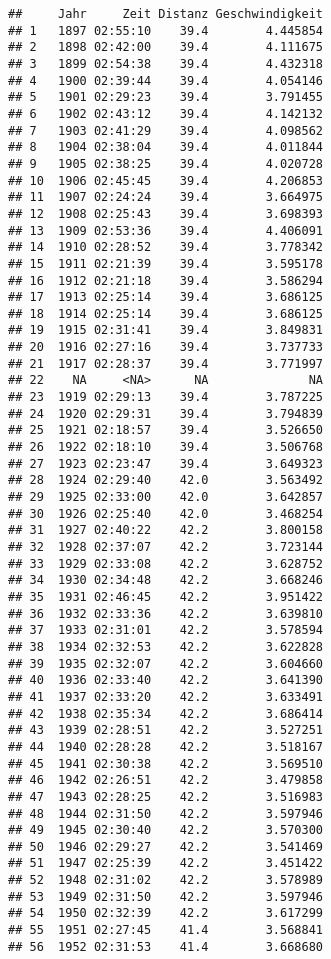 \documentclass[
]{article}
\begin{document}
\begin{verbatim}
##     Jahr     Zeit Distanz Geschwindigkeit
## 1   1897 02:55:10    39.4        4.445854
## 2   1898 02:42:00    39.4        4.111675
## 3   1899 02:54:38    39.4        4.432318
## 4   1900 02:39:44    39.4        4.054146
## 5   1901 02:29:23    39.4        3.791455
## 6   1902 02:43:12    39.4        4.142132
## 7   1903 02:41:29    39.4        4.098562
## 8   1904 02:38:04    39.4        4.011844
## 9   1905 02:38:25    39.4        4.020728
## 10  1906 02:45:45    39.4        4.206853
## 11  1907 02:24:24    39.4        3.664975
## 12  1908 02:25:43    39.4        3.698393
## 13  1909 02:53:36    39.4        4.406091
## 14  1910 02:28:52    39.4        3.778342
## 15  1911 02:21:39    39.4        3.595178
## 16  1912 02:21:18    39.4        3.586294
## 17  1913 02:25:14    39.4        3.686125
## 18  1914 02:25:14    39.4        3.686125
## 19  1915 02:31:41    39.4        3.849831
## 20  1916 02:27:16    39.4        3.737733
## 21  1917 02:28:37    39.4        3.771997
## 22    NA     <NA>      NA              NA
## 23  1919 02:29:13    39.4        3.787225
## 24  1920 02:29:31    39.4        3.794839
## 25  1921 02:18:57    39.4        3.526650
## 26  1922 02:18:10    39.4        3.506768
## 27  1923 02:23:47    39.4        3.649323
## 28  1924 02:29:40    42.0        3.563492
## 29  1925 02:33:00    42.0        3.642857
## 30  1926 02:25:40    42.0        3.468254
## 31  1927 02:40:22    42.2        3.800158
## 32  1928 02:37:07    42.2        3.723144
## 33  1929 02:33:08    42.2        3.628752
## 34  1930 02:34:48    42.2        3.668246
## 35  1931 02:46:45    42.2        3.951422
## 36  1932 02:33:36    42.2        3.639810
## 37  1933 02:31:01    42.2        3.578594
## 38  1934 02:32:53    42.2        3.622828
## 39  1935 02:32:07    42.2        3.604660
## 40  1936 02:33:40    42.2        3.641390
## 41  1937 02:33:20    42.2        3.633491
## 42  1938 02:35:34    42.2        3.686414
## 43  1939 02:28:51    42.2        3.527251
## 44  1940 02:28:28    42.2        3.518167
## 45  1941 02:30:38    42.2        3.569510
## 46  1942 02:26:51    42.2        3.479858
## 47  1943 02:28:25    42.2        3.516983
## 48  1944 02:31:50    42.2        3.597946
## 49  1945 02:30:40    42.2        3.570300
## 50  1946 02:29:27    42.2        3.541469
## 51  1947 02:25:39    42.2        3.451422
## 52  1948 02:31:02    42.2        3.578989
## 53  1949 02:31:50    42.2        3.597946
## 54  1950 02:32:39    42.2        3.617299
## 55  1951 02:27:45    41.4        3.568841
## 56  1952 02:31:53    41.4        3.668680

\end{verbatim}
\end{document}
